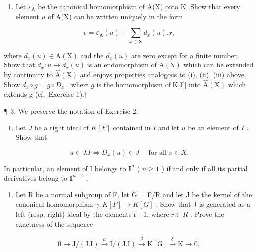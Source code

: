 \begin{enumerate}
\def\labelenumi{(\alph{enumi})}
\setcounter{enumi}{3}
\tightlist
\item
  Let \(\varepsilon_{\mathrm{A}}\) be the canonical homomorphism of A(X) onto K. Show that every element \(u\) of A(X) can be written uniquely in the form
\end{enumerate}

\[
u = \varepsilon_ {\mathrm{A}} (u) + \sum_ {x \in \mathbf {X}} d _ {x} (u). x,
\]

where \(d_{x}(u) \in \mathrm{A}(\mathrm{X})\) and the \(d_{x}(u)\) are zero except for a finite number. Show that \(d_{x}: u \to d_{x}(u)\) is an endomorphism of \(\mathrm{A}(\mathrm{X})\) which can be extended by continuity to \(\hat{\mathrm{A}}(\mathrm{X})\) and enjoys properties analogous to (i), (ii), (iii) above. Show \(d_{x} \circ \tilde{g} = \tilde{g} \circ D_{x}\) , where \(\tilde{g}\) is the homomorphism of K{[}F{]} into \(\hat{\mathrm{A}}(\mathrm{X})\) which extends g (cf.~Exercise 1).†

¶ 3. We preserve the notation of Exercise 2.

\begin{enumerate}
\def\labelenumi{(\alph{enumi})}
\tightlist
\item
  Let \(J\) be a right ideal of \(K[F]\) contained in \(I\) and let \(u\) be an element of \(I\) . Show that
\end{enumerate}

\[
u \in J. I \Leftrightarrow D _ {x} (u) \in J \quad \text { for   all } x \in X.
\]

In particular, an element of I belongs to \(\mathbf{I}^n\) ( \(n \geqslant 1\) ) if and only if all its partial derivatives belong to \(\mathbf{I}^{n-1}\) .


\begin{enumerate}
\def\labelenumi{(\alph{enumi})}
\setcounter{enumi}{1}
\tightlist
\item
  Let R be a normal subgroup of F, let G = F/R and let J be the kernel of the canonical homomorphism \(\gamma: K[F] \to K[G]\) . Show that J is generated as a left (resp. right) ideal by the elements r - 1, where \(r \in R\) . Prove the exactness of the sequence
\end{enumerate}

\[
0 \longrightarrow \mathrm{J} / (\mathrm{J}. \mathrm{I}) \stackrel {\alpha} {\longrightarrow} \mathrm{I} / (\mathrm{J}. \mathrm{I}) \stackrel {\beta} {\longrightarrow} \mathrm{K} [ \mathrm{G} ] \stackrel {\delta} {\longrightarrow} \mathrm{K} \longrightarrow 0,\tag{*}
\]

